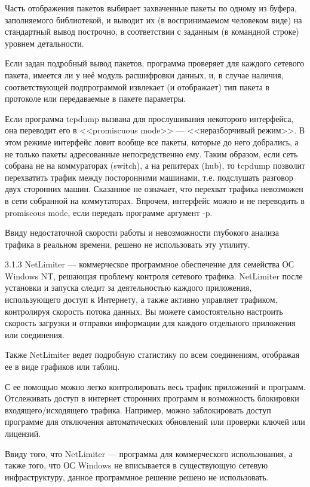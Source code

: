Часть отображения пакетов выбирает захваченные пакеты по одному из буфера, заполняемого библиотекой, и выводит их (в воспринимаемом человеком виде) на стандартный вывод построчно, в соответствии с заданным (в командной строке) уровнем детальности.\par 

Если задан подробный вывод пакетов, программа проверяет для каждого сетевого пакета, имеется ли у неё модуль расшифровки данных, и, в случае наличия, соответствующей подпрограммой извлекает (и отображает) тип пакета в протоколе или передаваемые в пакете параметры.\par 

Если программа tcpdump вызвана для прослушивания некоторого интерфейса, она переводит его в <<promiscuous mode>> --- <<неразборчивый режим>>. В этом режиме интерфейс ловит вообще все пакеты, которые до него добрались, а не только пакеты адресованные непосредственно ему. Таким образом, если сеть собрана не на коммураторах (switch), а на репитерах (hub), то tcpdump позволит перехватить трафик между посторонними машинами, т.е. подслушать разговор двух сторонних машин. Сказанное не означает, что перехват трафика невозможен в сети собранной на коммутаторах. Впрочем, интерфейс можно и не переводить в promiscous mode, если передать программе аргумент -p.\par 

Ввиду недостаточной скорости работы и невозможности глубокого анализа трафика в реальном времени, решено не использовать эту утилиту.\par 

3.1.3  NetLimiter --- коммерческое программное обеспечение для семейства ОС Windows NT, решающая проблему контроля сетевого трафика. NetLimiter после установки и запуска следит за деятельностью каждого приложения, использующего доступ к Интернету, а также активно управляет трафиком, контролируя скорость потока данных. Вы можете самостоятельно настроить скорость загрузки и отправки информации для каждого отдельного приложения или соединения.\par 

Также NetLimiter ведет подробную статистику по всем соединениям, отображая ее в виде графиков или таблиц.\par 

С ее помощью можно легко контролировать весь трафик приложений и программ. Отслеживать доступ в интернет сторонних программ и возможность блокировки входящего/исходящего трафика. Например, можно заблокировать доступ программе для отключения автоматических обновлений или проверки ключей или лицензий.\par 

Ввиду того, что NetLimiter --- программа для коммерческого использования, а также того, что ОС Windows не вписывается в существующую сетевую инфраструктуру, данное программное решение решено не использовать.\\

